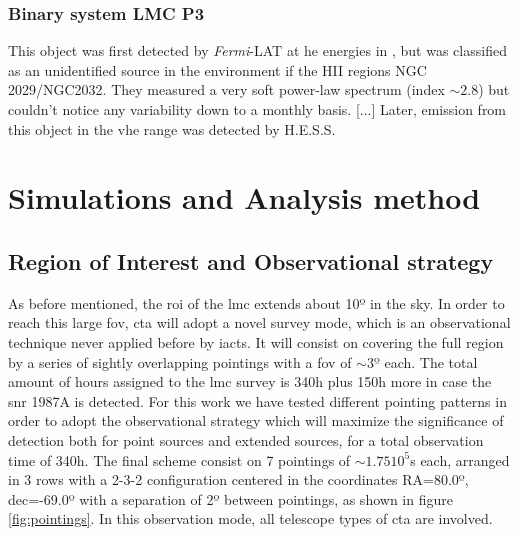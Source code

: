 \documentclass[main.tex]{subfiles}
\begin{document}
\subsubsection{Binary system LMC P3}
This object was first detected by \textit{Fermi}-LAT at \gls{he} energies in \cite{2016LMCFermiLAT}, but was classified as an unidentified source in the environment if the HII regions NGC 2029/NGC2032. They measured a very soft power-law spectrum (index $\sim 2.8$) but couldn't notice any variability down to a monthly basis. [...]
    Later, emission from this object in the \gls{vhe} range was detected by H.E.S.S. \cite{2017HESSLMCP3}

    \section{Simulations and Analysis method} \label{sec:simana}

    \subsection{Region of Interest and Observational strategy}

    As before mentioned, the  \gls{roi} of the \gls{lmc} extends about 10º in the sky. In order to reach this large \gls{fov}, \gls{cta} will adopt a novel survey mode, which is an observational technique never applied before by \glspl{iact}. It will consist on covering the full region by a series of sightly overlapping pointings with a \gls{fov} of $\sim 3º$ each. The total amount of hours assigned to the \gls{lmc} survey is 340h plus 150h more in case the \gls{snr} 1987A is detected. For this work we have tested different pointing patterns in order to adopt the observational strategy which will maximize the significance of detection both for point sources and extended sources, for a total observation time of 340h. The final scheme consist on 7 pointings of $\sim 1.75 10^5$s each, arranged in 3 rows with a 2-3-2 configuration centered in the coordinates RA=80.0º, dec=-69.0º with a separation of 2º between pointings, as shown in figure \ref{fig:pointings}. In this observation mode, all telescope types of \gls{cta} are involved.
\end{document}
